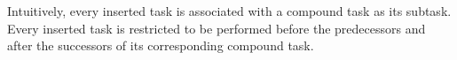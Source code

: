 \documentclass[letterpaper]{article} %
\newcommand{\Operators}{\mathcal{O}}
\newcommand{\Cactions}{\mathcal{C}}
\newcommand{\HtnDomain}{\mathfrak{D}}
\newcommand{\Methods}{\mathcal{M}}
\newcommand{\Lvar}{\mathcal{L}}
\newcommand{\Constraint}{\prec}
\newcommand{\aspprec}{\ll}
\newcommand{\decomposeMethods}{N}
\newcommand{\improveFunction}{\rho}
\begin{document}
Intuitively, every inserted task is associated with a compound task as its subtask.
Every inserted task is restricted to be performed before the predecessors and after the successors of its corresponding compound task. %
%
\end{document}

